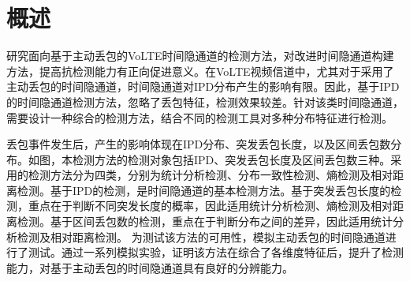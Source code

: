 \section{概述}
\label{chap:analyze:overview}

研究面向基于主动丢包的VoLTE时间隐通道的检测方法，对改进时间隐通道构建方法，提高抗检测能力有正向促进意义。在VoLTE视频信道中，尤其对于采用了主动丢包的时间隐通道，时间隐通道对IPD分布产生的影响有限。因此，基于IPD的时间隐通道检测方法，忽略了丢包特征，检测效果较差。针对该类时间隐通道，需要设计一种综合的检测方法，结合不同的检测工具对多种分布特征进行检测。


丢包事件发生后，产生的影响体现在IPD分布、突发丢包长度，以及区间丢包数分布。如图，本检测方法的检测对象包括IPD、突发丢包长度及区间丢包数三种。采用的检测方法分为四类，分别为统计分析检测、分布一致性检测、熵检测及相对距离检测。基于IPD的检测，是时间隐通道的基本检测方法。基于突发丢包长度的检测，重点在于判断不同突发长度的概率，因此适用统计分析检测、熵检测及相对距离检测。基于区间丢包数的检测，重点在于判断分布之间的差异，因此适用统计分析检测及相对距离检测。
为测试该方法的可用性，模拟主动丢包的时间隐通道进行了测试。通过一系列模拟实验，证明该方法在综合了各维度特征后，提升了检测能力，对基于主动丢包的时间隐通道具有良好的分辨能力。